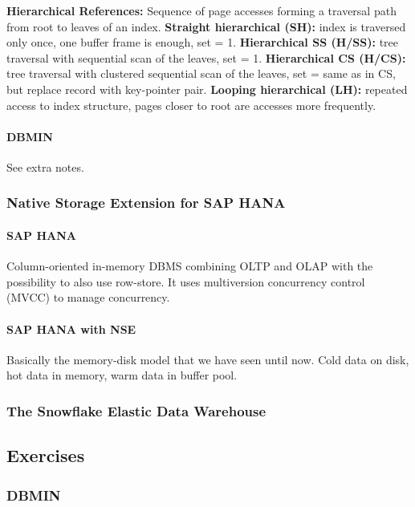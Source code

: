 \textbf{Hierarchical References:} Sequence of page accesses forming a traversal path from root to leaves of an index. \textbf{Straight hierarchical (SH):} index is traversed only once, one buffer frame is enough, set = 1. \textbf{Hierarchical SS (H/SS):} tree traversal with sequential scan of the leaves, set = 1. \textbf{Hierarchical CS (H/CS):} tree traversal with clustered sequential scan of the leaves, set = same as in CS, but replace record with key-pointer pair. \textbf{Looping hierarchical (LH):} repeated access to index structure, pages closer to root are accesses more frequently. %

\paragraph{DBMIN}
See extra notes.







\subsubsection{Native Storage Extension for SAP HANA}

\paragraph{SAP HANA}
Column-oriented in-memory DBMS combining OLTP and OLAP with the possibility to also use row-store. It uses multiversion concurrency control (MVCC) to manage concurrency.

\paragraph{SAP HANA with NSE}
Basically the memory-disk model that we have seen until now. Cold data on disk, hot data in memory, warm data in buffer pool.






\subsubsection{The Snowflake Elastic Data Warehouse}










\subsection{Exercises}

\subsubsection{DBMIN}
